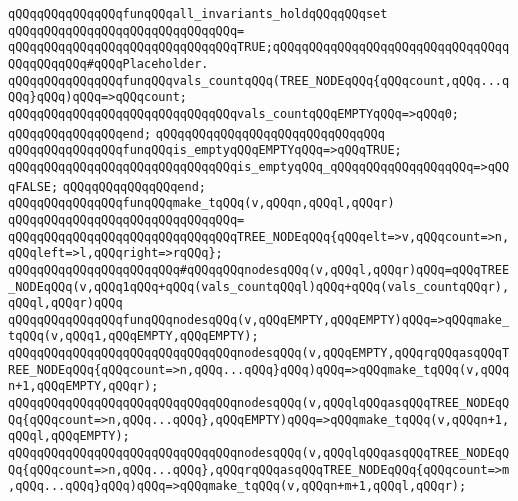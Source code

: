 \newline
\verb|qQQqqQQqqQQqqQQqfunqQQqall_invariants_holdqQQqqQQqset|\newline
\verb|qQQqqQQqqQQqqQQqqQQqqQQqqQQqqQQq=|\newline
\verb|qQQqqQQqqQQqqQQqqQQqqQQqqQQqqQQqTRUE;qQQqqQQqqQQqqQQqqQQqqQQqqQQqqQQqqQQqqQQqqQQq#qQQqPlaceholder.|\newline
\newline
\newline
\verb|qQQqqQQqqQQqqQQqfunqQQqvals_countqQQq(TREE_NODEqQQq{qQQqcount,qQQq...qQQq}qQQq)qQQq=>qQQqcount;|\newline
\verb|qQQqqQQqqQQqqQQqqQQqqQQqqQQqqQQqvals_countqQQqEMPTYqQQq=>qQQq0;|\newline
\verb|qQQqqQQqqQQqqQQqend;|\newline
\verb|qQQqqQQqqQQqqQQqqQQqqQQqqQQqqQQq|\newline
\verb|qQQqqQQqqQQqqQQqfunqQQqis_emptyqQQqEMPTYqQQq=>qQQqTRUE;|\newline
\verb|qQQqqQQqqQQqqQQqqQQqqQQqqQQqqQQqis_emptyqQQq_qQQqqQQqqQQqqQQqqQQq=>qQQqFALSE;|\newline
\verb|qQQqqQQqqQQqqQQqend;|\newline
\newline
\verb|qQQqqQQqqQQqqQQqfunqQQqmake_tqQQq(v,qQQqn,qQQql,qQQqr)|\newline
\verb|qQQqqQQqqQQqqQQqqQQqqQQqqQQqqQQq=|\newline
\verb|qQQqqQQqqQQqqQQqqQQqqQQqqQQqqQQqTREE_NODEqQQq{qQQqelt=>v,qQQqcount=>n,qQQqleft=>l,qQQqright=>rqQQq};|\newline
\newline
\verb|qQQqqQQqqQQqqQQqqQQqqQQq#qQQqqQQqnodesqQQq(v,qQQql,qQQqr)qQQq=qQQqTREE_NODEqQQq(v,qQQq1qQQq+qQQq(vals_countqQQql)qQQq+qQQq(vals_countqQQqr),qQQql,qQQqr)qQQq|\newline
\newline
\verb|qQQqqQQqqQQqqQQqfunqQQqnodesqQQq(v,qQQqEMPTY,qQQqEMPTY)qQQq=>qQQqmake_tqQQq(v,qQQq1,qQQqEMPTY,qQQqEMPTY);|\newline
\verb|qQQqqQQqqQQqqQQqqQQqqQQqqQQqqQQqnodesqQQq(v,qQQqEMPTY,qQQqrqQQqasqQQqTREE_NODEqQQq{qQQqcount=>n,qQQq...qQQq}qQQq)qQQq=>qQQqmake_tqQQq(v,qQQqn+1,qQQqEMPTY,qQQqr);|\newline
\verb|qQQqqQQqqQQqqQQqqQQqqQQqqQQqqQQqnodesqQQq(v,qQQqlqQQqasqQQqTREE_NODEqQQq{qQQqcount=>n,qQQq...qQQq},qQQqEMPTY)qQQq=>qQQqmake_tqQQq(v,qQQqn+1,qQQql,qQQqEMPTY);|\newline
\verb|qQQqqQQqqQQqqQQqqQQqqQQqqQQqqQQqnodesqQQq(v,qQQqlqQQqasqQQqTREE_NODEqQQq{qQQqcount=>n,qQQq...qQQq},qQQqrqQQqasqQQqTREE_NODEqQQq{qQQqcount=>m,qQQq...qQQq}qQQq)qQQq=>qQQqmake_tqQQq(v,qQQqn+m+1,qQQql,qQQqr);|\newline
